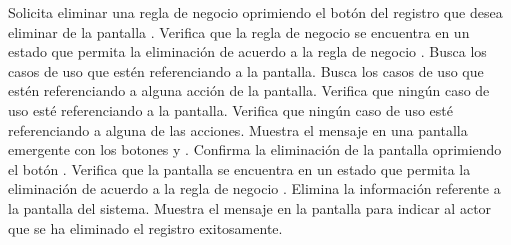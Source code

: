  \begin{UCtrayectoria}
    \UCpaso[\UCactor] Solicita eliminar una regla de negocio oprimiendo el botón \btnEliminar del registro que desea eliminar de la pantalla .
    \UCpaso[\UCsist] Verifica que la regla de negocio se encuentra en un estado que permita la eliminación de acuerdo a la regla de negocio . 
    \UCpaso[\UCsist] Busca los casos de uso que estén referenciando a la pantalla.
    \UCpaso[\UCsist] Busca los casos de uso que estén referenciando a alguna acción de la pantalla.
    \UCpaso[\UCsist] Verifica que ningún caso de uso esté referenciando a la pantalla. 
    \UCpaso[\UCsist] Verifica que ningún caso de uso esté referenciando a alguna de las acciones. 
    \UCpaso[\UCsist] Muestra el mensaje  en una pantalla emergente con los botones  y .
    \UCpaso[\UCactor] Confirma la eliminación de la pantalla oprimiendo el botón . 
    \UCpaso[\UCsist] Verifica que la pantalla se encuentra en un estado que permita la eliminación de acuerdo a la regla de negocio . 
    \UCpaso[\UCsist] Elimina la información referente a la pantalla del sistema.
    \UCpaso[\UCsist] Muestra el mensaje  en la pantalla 
    para indicar al actor que se ha eliminado el registro exitosamente.
 \end{UCtrayectoria}
 
